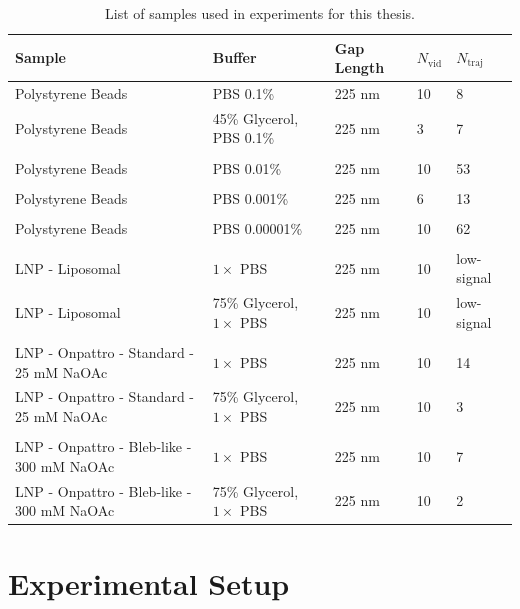 \begin{table}
    \centering
    \begin{tabularx}{\textwidth}{@{}Xllll@{}}
        \toprule
        Sample & Buffer & Gap Length&  $N_\mathrm{vid}$ & $N_\mathrm{traj}$ \\
        \midrule
        Polystyrene Beads & PBS 0.1\%  & 225 nm& 10 & 8\\
        Polystyrene Beads & 45\% Glycerol, PBS 0.1\%  & 225 nm & 3 & 7\\
         \vspace{2pt}& & & \\
        Polystyrene Beads & PBS 0.01\%  & 225 nm& 10& 53\\
         \vspace{2pt}& & & \\
        Polystyrene Beads & PBS 0.001\%  & 225 nm& 6 & 13\\
         \vspace{2pt}& & \\
        Polystyrene Beads & PBS 0.00001\%  & 225 nm& 10 & 62\\
        \vspace{2pt}&& & \\
        LNP - Liposomal & $1\times$ PBS & 225 nm& 10& low-signal\\
        LNP - Liposomal & 75\% Glycerol, $1\times$ PBS & 225 nm& 10 &low-signal \\
         \vspace{2pt} & & \\
        LNP - Onpattro - Standard - 25 mM NaOAc & $1\times$ PBS & 225 nm& 10& 14\\
        LNP - Onpattro - Standard - 25 mM NaOAc & 75\% Glycerol, $1\times$ PBS & 225 nm& 10&3 \\
         \vspace{2pt}&& & \\
        LNP - Onpattro - Bleb-like - 300 mM NaOAc & $1\times$ PBS & 225 nm& 10& 7\\
        LNP - Onpattro - Bleb-like - 300 mM NaOAc & 75\% Glycerol, $1\times$ PBS & 225 nm&10 & 2 \\
        \bottomrule
    \end{tabularx}
    \caption{List of samples used in experiments for this thesis.}
    \label{tab:sample_list}
\end{table}

\clearpage
\section{Experimental Setup}
\label{sec:methods}

